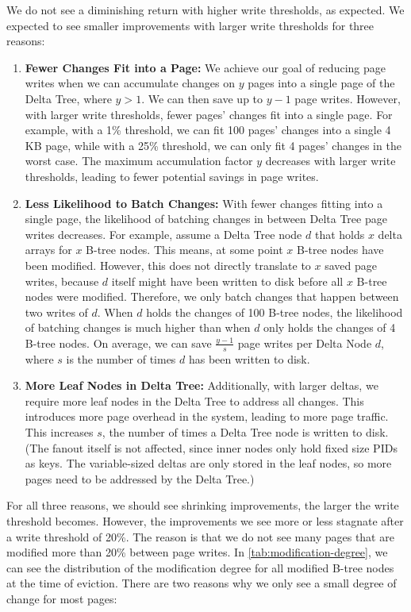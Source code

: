 We do not see a diminishing return with higher write thresholds, as expected.
We expected to see smaller improvements with larger write thresholds for three reasons:
\begin{enumerate}
\item \textbf{Fewer Changes Fit into a Page:} 
We achieve our goal of reducing page writes when we can accumulate changes on $y$ pages into a single page of the Delta Tree, where $y > 1$.
We can then save up to $y - 1$ page writes.
However, with larger write thresholds, fewer pages' changes fit into a single page.
For example, with a 1\% threshold, we can fit 100 pages' changes into a single 4 KB page, while with a 25\% threshold, we can only fit 4 pages' changes in the worst case.
The maximum accumulation factor $y$ decreases with larger write thresholds, leading to fewer potential savings in page writes.
\item \textbf{Less Likelihood to Batch Changes:}
With fewer changes fitting into a single page, the likelihood of batching changes in between Delta Tree page writes decreases.
For example, assume a Delta Tree node $d$ that holds $x$ delta arrays for $x$ B-tree nodes.
This means, at some point $x$ B-tree nodes have been modified. 
However, this does not directly translate to $x$ saved page writes, because $d$ itself might have been written to disk before all $x$ B-tree nodes were modified.
Therefore, we only batch changes that happen between two writes of $d$.
When $d$ holds the changes of 100 B-tree nodes, the likelihood of batching changes is much higher than when $d$ only holds the changes of 4 B-tree nodes.
On average, we can save $\frac{y - 1}{s}$ page writes per Delta Node $d$, where $s$ is the number of times $d$ has been written to disk.
\item \textbf{More Leaf Nodes in Delta Tree:}
Additionally, with larger deltas, we require more leaf nodes in the Delta Tree to address all changes.
This introduces more page overhead in the system, leading to more page traffic.
This increases $s$, the number of times a Delta Tree node is written to disk.
(The fanout itself is not affected, since inner nodes only hold fixed size \ac{PID}s as keys. The variable-sized deltas are only stored in the leaf nodes, so more pages need to be addressed by the Delta Tree.)
\end{enumerate}

For all three reasons, we should see shrinking improvements, the larger the write threshold becomes.
However, the improvements we see more or less stagnate after a write threshold of 20\%.
The reason is that we do not see many pages that are modified more than 20\% between page writes.
In \autoref{tab:modification-degree}, we can see the distribution of the modification degree for all modified B-tree nodes at the time of eviction.
There are two reasons why we only see a small degree of change for most pages:

